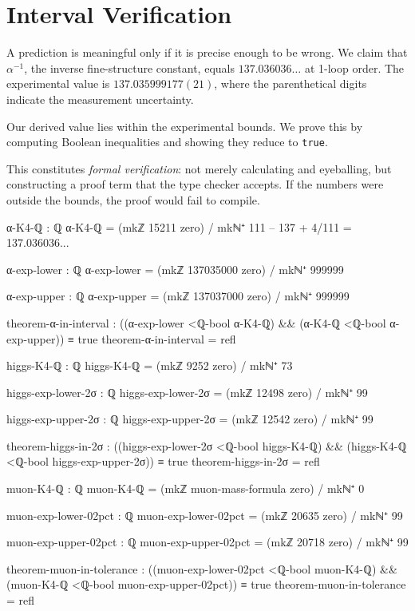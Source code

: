 \documentclass[11pt,a4paper]{book}
\begin{document}
\section{Interval Verification}

A prediction is meaningful only if it is precise enough to be wrong. We claim that $\alpha^{-1}$, 
the inverse fine-structure constant, equals $137.036036\ldots$ at 1-loop order. The experimental 
value is $137.035999177(21)$, where the parenthetical digits indicate the measurement uncertainty.

Our derived value lies within the experimental bounds. We prove this by computing Boolean 
inequalities and showing they reduce to \texttt{true}.

This constitutes \emph{formal verification}: not merely calculating and eyeballing, but constructing 
a proof term that the type checker accepts. If the numbers were outside the bounds, the proof 
would fail to compile.

\begin{code}
α-K4-ℚ : ℚ
α-K4-ℚ = (mkℤ 15211 zero) / mkℕ⁺ 111  -- 137 + 4/111 = 137.036036...

α-exp-lower : ℚ
α-exp-lower = (mkℤ 137035000 zero) / mkℕ⁺ 999999

α-exp-upper : ℚ
α-exp-upper = (mkℤ 137037000 zero) / mkℕ⁺ 999999

theorem-α-in-interval : ((α-exp-lower <ℚ-bool α-K4-ℚ) && (α-K4-ℚ <ℚ-bool α-exp-upper)) ≡ true
theorem-α-in-interval = refl
\end{code}

\begin{code}
higgs-K4-ℚ : ℚ
higgs-K4-ℚ = (mkℤ 9252 zero) / mkℕ⁺ 73

higgs-exp-lower-2σ : ℚ
higgs-exp-lower-2σ = (mkℤ 12498 zero) / mkℕ⁺ 99

higgs-exp-upper-2σ : ℚ
higgs-exp-upper-2σ = (mkℤ 12542 zero) / mkℕ⁺ 99

theorem-higgs-in-2σ : ((higgs-exp-lower-2σ <ℚ-bool higgs-K4-ℚ) && (higgs-K4-ℚ <ℚ-bool higgs-exp-upper-2σ)) ≡ true
theorem-higgs-in-2σ = refl
\end{code}

\begin{code}
muon-K4-ℚ : ℚ
muon-K4-ℚ = (mkℤ muon-mass-formula zero) / mkℕ⁺ 0

muon-exp-lower-02pct : ℚ
muon-exp-lower-02pct = (mkℤ 20635 zero) / mkℕ⁺ 99

muon-exp-upper-02pct : ℚ
muon-exp-upper-02pct = (mkℤ 20718 zero) / mkℕ⁺ 99

theorem-muon-in-tolerance : ((muon-exp-lower-02pct <ℚ-bool muon-K4-ℚ) && (muon-K4-ℚ <ℚ-bool muon-exp-upper-02pct)) ≡ true
theorem-muon-in-tolerance = refl
\end{code}
\end{document}
